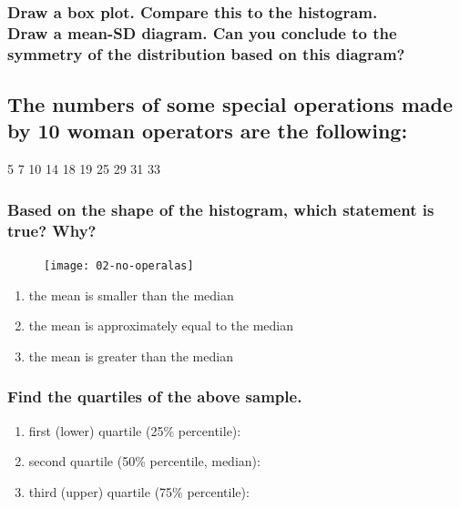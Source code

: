 	\clearpage
	\subsubsection*{Draw a box plot. Compare this to the histogram.\\
		Draw a mean-SD diagram. Can you conclude to the symmetry of the distribution based on this diagram?}
	\vspace{10em}

\subsection{The numbers of some special operations made by 10 woman operators are the following:}


	\begin{center}
	5  7  10  14  18  19  25  29  31  33
	\end{center}	
  	
	\subsubsection*{Based on the shape of the histogram, which statement is true? Why?}
	\begin{figure} \vspace{-140pt}
	  \begin{flushright}
	  	\texttt{[image: 02-no-operalas]}
	  \vspace{-140pt}
	  \end{flushright}
	\end{figure}	
	

	\begin{enumerate}
	\item the mean is smaller than the median
	\item the mean is approximately equal to the median
	\item the mean is greater than the median
	\end{enumerate}

	\subsubsection*{Find the quartiles of the above sample.}
	\begin{enumerate}
	\item first (lower) quartile (25\% percentile):
	\item second quartile (50\% percentile, median):
	\item third (upper) quartile (75\% percentile):
	\end{enumerate}



